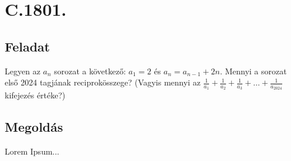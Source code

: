 \documentclass[a4paper,12pt]{article}
\begin{document}
\section*{\Large C.1801.}\label{par:8}
\subsection*{Feladat}
Legyen az $a_n$ sorozat a következő: $a_1=2$ és $a_n=a_{n-1}+2n$. Mennyi a sorozat első 2024 tagjának reciprokösszege? (Vagyis mennyi az $\frac{1}{a_1}+\frac{1}{a_2}+\frac{1}{a_3}+ \dots +\frac{1}{a_{2024}}$ kifejezés értéke?)
\subsection*{Megoldás}
Lorem Ipsum...
\end{document}
